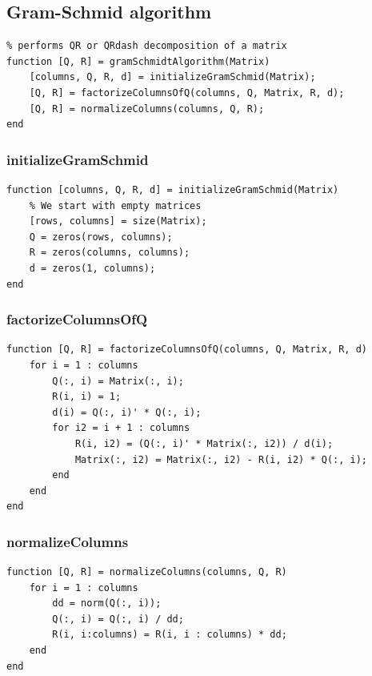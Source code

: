 \subsection{Gram-Schmid algorithm}

\begin{simplechar}
\begin{lstlisting}
% performs QR or QRdash decomposition of a matrix
function [Q, R] = gramSchmidtAlgorithm(Matrix)
    [columns, Q, R, d] = initializeGramSchmid(Matrix);
    [Q, R] = factorizeColumnsOfQ(columns, Q, Matrix, R, d);
    [Q, R] = normalizeColumns(columns, Q, R);
end
\end{lstlisting}
\end{simplechar}

\subsubsection{initializeGramSchmid}
\begin{simplechar}
\begin{lstlisting}
function [columns, Q, R, d] = initializeGramSchmid(Matrix)
    % We start with empty matrices
    [rows, columns] = size(Matrix);
    Q = zeros(rows, columns);
    R = zeros(columns, columns);
    d = zeros(1, columns);
end
\end{lstlisting}
\end{simplechar}

\subsubsection{factorizeColumnsOfQ}
\begin{simplechar}
\begin{lstlisting}
function [Q, R] = factorizeColumnsOfQ(columns, Q, Matrix, R, d)
    for i = 1 : columns
        Q(:, i) = Matrix(:, i);
        R(i, i) = 1;
        d(i) = Q(:, i)' * Q(:, i);
        for i2 = i + 1 : columns
            R(i, i2) = (Q(:, i)' * Matrix(:, i2)) / d(i);
            Matrix(:, i2) = Matrix(:, i2) - R(i, i2) * Q(:, i);
        end
    end
end
\end{lstlisting}
\end{simplechar}

\subsubsection{normalizeColumns}
\begin{simplechar}
\begin{lstlisting}
function [Q, R] = normalizeColumns(columns, Q, R)
    for i = 1 : columns
        dd = norm(Q(:, i));
        Q(:, i) = Q(:, i) / dd;
        R(i, i:columns) = R(i, i : columns) * dd;
    end
end
\end{lstlisting}
\end{simplechar}

